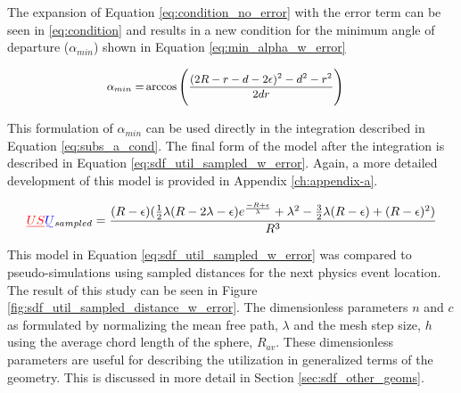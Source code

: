 The expansion of Equation \eqref{eq:condition_no_error} with the error term can be seen
in \eqref{eq:condition} and results in a new condition for the minimum angle of
departure ($\alpha_{min}$) shown in Equation \eqref{eq:min_alpha_w_error}

\begin{equation}
\small
\begin{split}
\alpha_{min} =& \arccos\Bigg ( \frac{(2R-r-d-2\epsilon)^2-d^2-r^2}{2 d r} \Bigg )
\end{split}
\label{eq:min_alpha_w_error}
\end{equation}

This formulation of $\alpha_{min}$ can be used directly in the integration described
in Equation \eqref{eq:subs_a_cond}. The final form of the model after the
integration is described in Equation \eqref{eq:sdf_util_sampled_w_error}. Again, a
more detailed development of this model is provided in Appendix \ref{ch:appendix-a}.

\begin{equation}
  \DIFdelbegin \DIFdel{US}\DIFdelend \DIFaddbegin \DIFadd{U}\DIFaddend _{sampled} = \frac{(R-\epsilon) (\frac{1}{2} \lambda ( R - 2\lambda - \epsilon ) e^{\frac{-R + \epsilon}{\lambda}} + \lambda^{2} - \frac{3}{2}\lambda(R - \epsilon) + (R-\epsilon)^{2})}{R^3}
  \label{eq:sdf_util_sampled_w_error}
\end{equation}



This model in Equation \eqref{eq:sdf_util_sampled_w_error} was compared to
pseudo-simulations using sampled distances for the next physics event
location. The result of this study can be seen in Figure
\ref{fig:sdf_util_sampled_distance_w_error}. The dimensionless parameters $n$
and $c$ as formulated by normalizing the mean free path, $\lambda$ and the mesh
step size, $h$ using the average chord length of the sphere, $R_{av}$. These
dimensionless parameters are useful for describing the utilization in
generalized terms of the geometry. This is discussed in more detail in
Section \ref{sec:sdf_other_geoms}.

